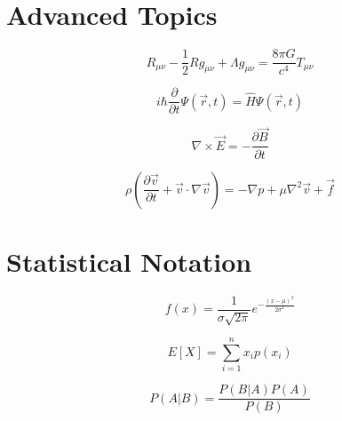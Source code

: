 \documentclass{article}
\begin{document}
\section{Advanced Topics}

$$R_{\mu\nu} - \frac{1}{2}Rg_{\mu\nu} + \Lambda g_{\mu\nu} = \frac{8\pi G}{c^4}T_{\mu\nu}$$

$$i\hbar\frac{\partial}{\partial t}\Psi(\vec{r},t) = \hat{H}\Psi(\vec{r},t)$$

$$\nabla \times \vec{E} = -\frac{\partial \vec{B}}{\partial t}$$

$$\rho\left(\frac{\partial \vec{v}}{\partial t} + \vec{v} \cdot \nabla\vec{v}\right) = -\nabla p + \mu\nabla^2\vec{v} + \vec{f}$$

\section{Statistical Notation}

$$f(x) = \frac{1}{\sigma\sqrt{2\pi}}e^{-\frac{(x-\mu)^2}{2\sigma^2}}$$

$$E[X] = \sum_{i=1}^{n} x_i p(x_i)$$

$$P(A|B) = \frac{P(B|A)P(A)}{P(B)}$$
\end{document}
